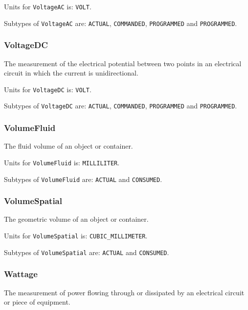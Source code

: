 Units for \texttt{VoltageAC} is: \texttt{VOLT}.


Subtypes of \texttt{VoltageAC} are: \texttt{ACTUAL}, \texttt{COMMANDED}, \texttt{PROGRAMMED} and \texttt{PROGRAMMED}. 
\FloatBarrier

\subsubsection{VoltageDC}
  \label{sec:VoltageDC}



The measurement of the electrical potential between two points in an electrical circuit in which the current is unidirectional.


Units for \texttt{VoltageDC} is: \texttt{VOLT}.


Subtypes of \texttt{VoltageDC} are: \texttt{ACTUAL}, \texttt{COMMANDED}, \texttt{PROGRAMMED} and \texttt{PROGRAMMED}. 
\FloatBarrier

\subsubsection{VolumeFluid}
  \label{sec:VolumeFluid}



The fluid volume of an object or container.


Units for \texttt{VolumeFluid} is: \texttt{MILLILITER}.


Subtypes of \texttt{VolumeFluid} are: \texttt{ACTUAL} and \texttt{CONSUMED}. 
\FloatBarrier

\subsubsection{VolumeSpatial}
  \label{sec:VolumeSpatial}



The geometric volume of an object or container.


Units for \texttt{VolumeSpatial} is: \texttt{CUBIC_MILLIMETER}.


Subtypes of \texttt{VolumeSpatial} are: \texttt{ACTUAL} and \texttt{CONSUMED}. 
\FloatBarrier

\subsubsection{Wattage}
  \label{sec:Wattage}



The measurement of power flowing through or dissipated by an electrical circuit or piece of equipment.


